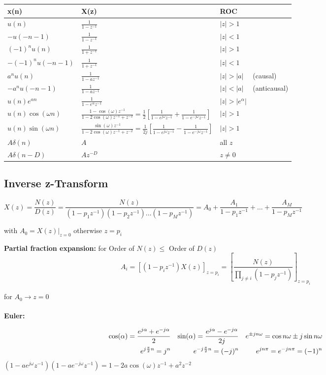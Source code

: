 \begin{tabular}{|l|l|l|}
	\hline
	\textbf{x(n)} & \textbf{X(z)} & \textbf{ROC} \\
	\hline
	$u(n)$ & $\frac{1}{1 - z^{-1}}$ & $|z|>1$ \\
	\hline
	$-u(-n-1)$ & $\frac{1}{1 - z^{-1}}$ & $|z|<1$ \\
	\hline
	$(-1)^n u(n)$ & $\frac{1}{1 + z^{-1}}$ & $|z|>1$ \\
	\hline
	$-(-1)^n u(-n-1)$ & $\frac{1}{1 + z^{-1}}$ & $|z|<1$ \\
	\hline
	$a^n u(n)$ & $\frac{1}{1 - az^{-1}}$ & $|z|>|a| \quad$ (causal) \\
	\hline
	$-a^n u(-n-1)$ & $\frac{1}{1 - az^{-1}}$ & $|z|<|a| \quad$ (anticausal) \\
	\hline
	$u(n)e^{\alpha n}$ & $\frac{1}{1-e^{\alpha}z^{-1}}$ & $|z|>|e^{\alpha}|$ \\
	\hline
	$u(n)\cos(\omega n)$ & $\frac{1-\cos(\omega)z^{-1}}{1-2\cos(\omega)z^{-1}+z^{-2}}
	 = \frac{1}{2}\left[\frac{1}{1-e^{j\omega}z^{-1}}+ \frac{1}{1-e^{-j\omega}z^{-1}}\right]$ & $|z|>1$\\
	\hline
	$u(n)\sin(\omega n)$ & $\frac{\sin(\omega)z^{-1}}{1-2\cos(\omega)z^{-1}+z^{-2}}
  = \frac{1}{2j}\left[\frac{1}{1-e^{j\omega}z^{-1}}- \frac{1}{1-e^{-j\omega}z^{-1}}\right]$ & $|z|>1$\\
	\hline
	$A\delta(n)$ & $A$ & all $z$\\
	\hline
	$A\delta(n-D)$ & $Az^{-D}$ & $z\neq 0$\\
	\hline
\end{tabular}


\subsection{Inverse z-Transform}

$X(z) = \dfrac{N(z)}{D(z)} = \dfrac{N(z)}{(1-p_1z^{-1})(1-p_2z^{-1})\ldots(1-p_Mz^{-1})} = 
A_0 + \dfrac{A_1}{1-p_1z^{-1}} + \ldots + \dfrac{A_M}{1-p_Mz^{-1}}$

with $A_0 = X(z)|_{z=0}$ otherwise $z = p_i$

\textbf{Partial fraction expansion:} for Order of $N(z) \leq$ Order of $D(z)$ \\
\[A_i = [(1-p_iz^{-1})X(z)]_{z=p_i} = \left[\frac{N(z)}{\prod\limits_{j\neq i}(1-p_jz^{-1})}\right]_{z=p_i}\]

for $A_0 \rightarrow z=0$\\ \\

\textbf{Euler:}

\begin{align}
\cos(\alpha) = \frac{e^{j\alpha} + e^{-j\alpha}}{2}
&& \sin(\alpha) = \frac{e^{j\alpha} - e^{-j\alpha}}{2j} && 
    {e}^{\pm jn\omega} = \cos{n\omega} \pm j \sin{n\omega} \notag\\
e^{j\frac{\pi}{2}n} = j^n & & e^{-j\frac{\pi}{2}n} = (-j)^n &&
e^{jn\pi}=e^{-jn\pi}=(-1)^n \notag
\end{align}
$(1-ae^{j\omega}z^{-1})(1-ae^{-j\omega}z^{-1}) = 1 - 2a\cos(\omega)z^{-1}+a^2z^{-2}$


